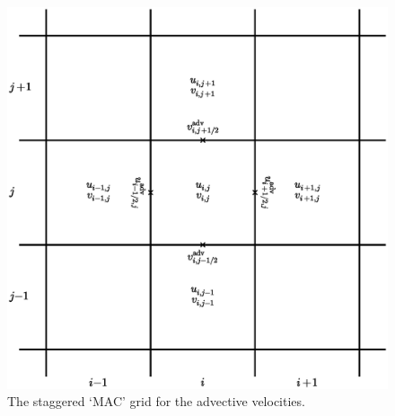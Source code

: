 \begin{figure}[h]
\centering
\includegraphics[width=0.8\linewidth]{MAC}
\caption[MAC grid for velocity]
  {\label{fig:MAC} The staggered `MAC' grid for the advective
  velocities.}
\end{figure}


